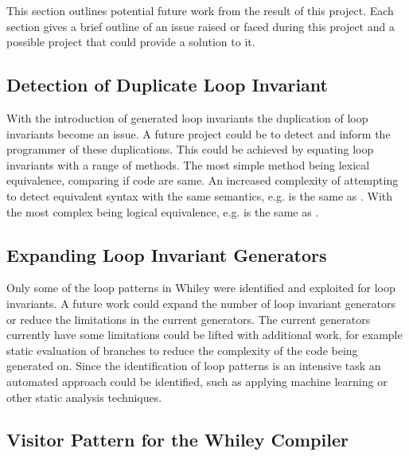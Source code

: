 This section outlines potential future work from the result of this project.
Each section gives a brief outline of an issue raised or faced during this
project and a possible project that could provide a solution to it.

\subsection{Detection of Duplicate Loop Invariant}

With the introduction of generated loop invariants the duplication of loop
invariants become an issue.
A future project could be to detect and inform the programmer of these
duplications.
This could be achieved by equating loop invariants with a range of methods.
The most simple method being lexical equivalence, comparing if code are same.
An increased complexity of attempting to detect equivalent syntax with the same
semantics, e.g.  is the same as .
With the most complex being logical equivalence, e.g.  is the same
as .


\subsection{Expanding Loop Invariant Generators}

Only some of the loop patterns in Whiley were identified and exploited for loop
invariants.
A future work could expand the number of loop invariant generators or reduce
the limitations in the current generators.
The current generators currently have some limitations could be lifted with
additional work, for example static evaluation of branches to reduce the
complexity of the code being generated on.
Since the identification of loop patterns is an intensive task an automated
approach could be identified, such as applying machine learning or other static
analysis techniques.

\subsection{Visitor Pattern for the Whiley Compiler}

